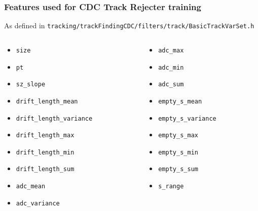 \documentclass[18pt, aspectratio=169]{beamer}
\begin{document}
\begin{frame}
  \frametitle{Features  used for CDC Track Rejecter training}
  As defined in \texttt{tracking/trackFindingCDC/filters/track/BasicTrackVarSet.h}
  \begin{columns}
    \begin{column}{0.5\textwidth}
      \begin{itemize}
      \item \lstinline{size}
      \item \lstinline{pt}
      \item \lstinline{sz_slope}
      \item \lstinline{drift_length_mean}
      \item \lstinline{drift_length_variance}
      \item \lstinline{drift_length_max}
      \item \lstinline{drift_length_min}
      \item \lstinline{drift_length_sum}
      \item \lstinline{adc_mean}
      \item \lstinline{adc_variance}
      \end{itemize}
    \end{column}
    \begin{column}{0.5\textwidth}
      \begin{itemize}

      \item \lstinline{adc_max}
      \item \lstinline{adc_min}
      \item \lstinline{adc_sum}
      \item \lstinline{empty_s_mean}
      \item \lstinline{empty_s_variance}
      \item \lstinline{empty_s_max}
      \item \lstinline{empty_s_min}
      \item \lstinline{empty_s_sum}
      \item \lstinline{s_range}
      \end{itemize}      
    \end{column}
  \end{columns}
\end{frame}
\end{document}
